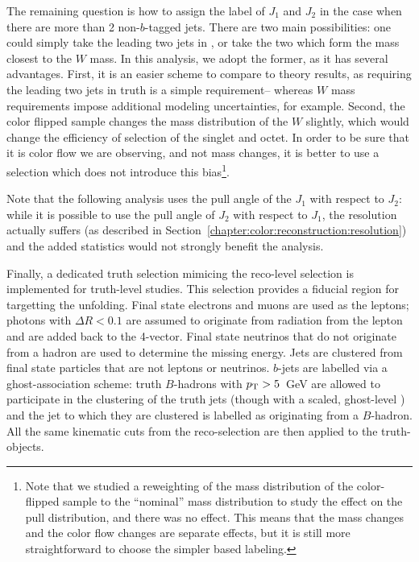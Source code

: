 
The remaining question is how to assign the label of $J_1$ and $J_2$ in the case when there are more than 2 non-$b$-tagged jets. There are two main possibilities: one could simply take the leading two jets in \pt, or take the two which form the mass closest to the $W$ mass. In this analysis, we adopt the former, as it has several advantages. First, it is an easier scheme to compare to theory results, as requiring the leading two jets in truth is a simple requirement-- whereas $W$ mass requirements impose additional modeling uncertainties, for example. Second, the color flipped sample changes the mass distribution of the $W$ slightly, which would change the efficiency of selection of the singlet and octet. In order to be sure that it is color flow we are observing, and not mass changes, it is better to use a selection which does not introduce this bias\footnote{Note that we studied a reweighting of the mass distribution of the color-flipped sample to the ``nominal'' mass distribution to study the effect on the pull distribution, and there was no effect. This means that the mass changes and the color flow changes are separate effects, but it is still more straightforward to choose the simpler \pt based labeling.}.

Note that the following analysis uses the pull angle of the $J_1$ with respect to $J_2$: while it is possible to use the pull angle of $J_2$ with respect to $J_1$, the resolution actually suffers (as described in Section~\ref{chapter:color:reconstruction:resolution}) and the added statistics would not strongly benefit the analysis.

Finally, a dedicated truth selection mimicing the reco-level selection is implemented for truth-level studies. This selection provides a fiducial region for targetting the unfolding. Final state electrons and muons are used as the leptons; photons with $\Delta R < 0.1$ are assumed to originate from radiation from the lepton and are added back to the 4-vector. Final state neutrinos that do not originate from a hadron are used to determine the missing energy. Jets are clustered from final state particles that are not leptons or neutrinos. $b$-jets are labelled via a ghost-association scheme: truth $B$-hadrons with $p_{\text{T}} > 5$~GeV are allowed to participate in the clustering of the truth jets (though with a scaled, ghost-level \pt) and the jet to which they are clustered is labelled as originating from a $B$-hadron. All the same kinematic cuts from the reco-selection are then applied to the truth-objects.

